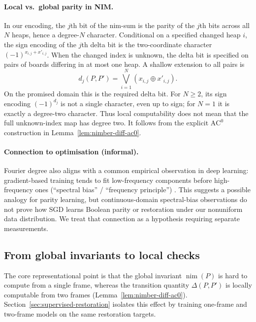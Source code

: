 \documentclass[twoside,11pt]{article}
\newcommand{\AC}{\mathrm{AC}}
\numberwithin{theorem}{section}
\numberwithin{equation}{section}
\begin{document}
\paragraph{Local vs.\ global parity in NIM.}
In our encoding, the $j$th bit of the nim-sum is the parity of the $j$th bits across all $N$ heaps, hence a degree-$N$ character.
Conditional on a specified changed heap $i$, the sign encoding of the $j$th delta bit is the two-coordinate character $(-1)^{x_{i,j}+x'_{i,j}}$. When the changed index is unknown, the delta bit is specified on pairs of boards differing in at most one heap. A shallow extension to all pairs is
\begin{equation}
d_j(P,P')=\bigvee_{i=1}^{N}(x_{i,j}\oplus x'_{i,j}).
\label{eq:delta-extension}
\end{equation}
On the promised domain this is the required delta bit. For $N\ge2$, its sign encoding $(-1)^{d_j}$ is not a single character, even up to sign; for $N=1$ it is exactly a degree-two character. Thus local computability does not mean that the full unknown-index map has degree two. It follows from the explicit $\AC^0$ construction in Lemma~\ref{lem:nimber-diff-ac0}.

\paragraph{Connection to optimisation (informal).}
Fourier degree also aligns with a common empirical observation in deep learning: gradient-based training tends to fit low-frequency components before high-frequency ones (``spectral bias'' / ``frequency principle'') \citep{rahaman2019spectral,xu2019frequency}.
This suggests a possible analogy for parity learning, but continuous-domain spectral-bias observations do not prove how SGD learns Boolean parity or restoration under our nonuniform data distribution. We treat that connection as a hypothesis requiring separate measurements.

\subsection{From global invariants to local checks}
The core representational point is that the global invariant $\operatorname{nim}(P)$ is hard to compute from a single frame, whereas the transition quantity $\Delta(P,P')$ is locally computable from two frames (Lemma~\ref{lem:nimber-diff-ac0}).
Section~\ref{sec:supervised-restoration} isolates this effect by training one-frame and two-frame models on the same restoration targets.
\end{document}
